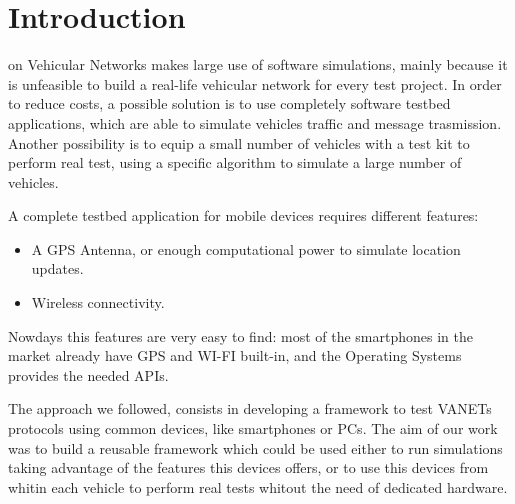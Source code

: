 \section{Introduction}
% 
% 
% 
% 
 on Vehicular Networks makes large use of software simulations, mainly because it is unfeasible to build a real-life vehicular network for every test project. 
In order to reduce costs, a possible solution is to use completely software testbed applications, which are able to simulate vehicles traffic and message trasmission\cite{gradinescu}.
Another possibility is to equip a small number of vehicles with a test kit to perform real test, using a specific algorithm to simulate a large number of vehicles\cite{rocetti}.


A complete testbed application for mobile devices requires different features:
\begin{itemize}
	\item A GPS Antenna, or enough computational power to simulate location updates.
	\item Wireless connectivity.
\end{itemize}

Nowdays this features are very easy to find: most of the smartphones in the market already have GPS and WI-FI built-in, and the Operating Systems provides the needed APIs.

The approach we followed, consists in developing a framework to test VANETs protocols using common devices, like smartphones or PCs. 
The aim of our work was to build a reusable framework which could be used either to run simulations taking advantage of the features this devices offers, or to use this devices from whitin each vehicle to perform real tests whitout the need of dedicated hardware.

